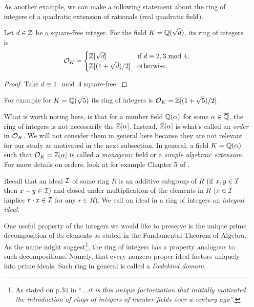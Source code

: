 As another example, we can make a following statement about the ring of integers of a quadratic extension of rationals (real quadratic field).
\begin{lemma}
     Let $d \in \mathbb{Z}$ be a square-free integer. For the field $K = \mathbb{Q}(\sqrt{d})$, its ring of integers is 
     \[ \mathcal{O}_K = 
	 \begin{cases} 
	     \mathbb{Z}[\sqrt{d}] & \text{if $d \equiv 2, 3 \text{ mod } 4$}, \\
	     \mathbb{Z}[(1 + \sqrt{d})/2] & \text{otherwise}.
     	 \end{cases}
     \]
\end{lemma}

\begin{proof}
	Take $d \equiv 1 \mod 4$ square-free. 
\end{proof}
For example for $K = \mathbb{Q}(\sqrt{5})$ its ring of integers is $\mathcal{O}_K = \mathbb{Z}[(1 + \sqrt{5})/2]$. 
\begin{remark}\label{monogenic}
	What is worth noting here, is that for a number field $\mathbb{Q}(\alpha)$ for some $\alpha \in \overline{\mathbb{Q}}$, the ring of integers is not necessarily the $\mathbb{Z}[\alpha]$. Instead, $\mathbb{Z}[\alpha]$ is what's called an \textit{order} in $\mathcal{O}_K$. We will not consider them in general here because they are not relevant for our study as motivated in the next subsection. In general, a field $K = \mathbb{Q}(\alpha)$ such that $\mathcal{O}_K = \mathbb{Z}[\alpha]$ is called a \textit{monogenic} field or a \textit{simple algebraic extension}. For more details on orders, look at for example Chapter 5 of \cite{stein}.
\end{remark}

Recall that an ideal $\mathcal{I}$ of some ring $R$ is an additive subgroup of $R$ (if $x,y \in \mathcal{I}$ then $x-y \in \mathcal{I}$) and closed under multiplication of the elements in $R$ ($x \in \mathcal{I}$ implies $r \cdot x \in \mathcal{I}$ for any $r \in R$). We call an ideal in a ring of integers an \textit{integral ideal}.

One useful property of the integers we would like to preserve is the unique prime decomposition of its elements as stated in the Fundamental Theorem of Algebra. As the name might suggest\footnote{As stated on p.34 in \cite{stein} ``\textit{...it is this unique factorization that initially motivated the introduction of rings of integers of number fields over a century ago''}.}, the ring of integers has a property analogous to such decompositions. Namely, that every nonzero proper ideal factors uniquely into prime ideals. Such ring in general is called a \textit{Dedekind domain}.

